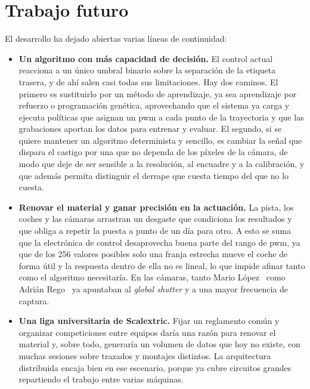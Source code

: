 \section{Trabajo futuro}
\label{sec:trabajofuturo}

El desarrollo ha dejado abiertas varias líneas de continuidad:

\begin{itemize}
\item \textbf{Un algoritmo con más capacidad de decisión.} El control actual reacciona a un único umbral binario sobre la separación de la etiqueta trasera, y de ahí salen casi todas sus limitaciones. Hay dos caminos. El primero es sustituirlo por un método de aprendizaje, ya sea aprendizaje por refuerzo o programación genética, aprovechando que el sistema ya carga y ejecuta políticas que asignan un \gls{pwm} a cada punto de la trayectoria y que las grabaciones aportan los datos para entrenar y evaluar. El segundo, si se quiere mantener un algoritmo determinista y sencillo, es cambiar la señal que dispara el castigo por una que no dependa de los píxeles de la cámara, de modo que deje de ser sensible a la resolución, al encuadre y a la calibración, y que además permita distinguir el derrape que cuesta tiempo del que no lo cuesta.

\item \textbf{Renovar el material y ganar precisión en la actuación.} La pista, los coches y las cámaras arrastran un desgaste que condiciona los resultados y que obliga a repetir la puesta a punto de un día para otro. A esto se suma que la electrónica de control desaprovecha buena parte del rango de \gls{pwm}, ya que de los 256 valores posibles solo una franja estrecha mueve el coche de forma útil y la respuesta dentro de ella no es lineal, lo que impide afinar tanto como el algoritmo necesitaría. En las cámaras, tanto Mario López~\cite{tfgmario} como Adrián Rego~\cite{tfgadrian} ya apuntaban al \textit{global shutter} y a una mayor frecuencia de captura.

\item \textbf{Una liga universitaria de Scalextric.} Fijar un reglamento común y organizar competiciones entre equipos daría una razón para renovar el material y, sobre todo, generaría un volumen de datos que hoy no existe, con muchas sesiones sobre trazados y montajes distintos. La arquitectura distribuida encaja bien en ese escenario, porque ya cubre circuitos grandes repartiendo el trabajo entre varias máquinas.


\end{itemize}
